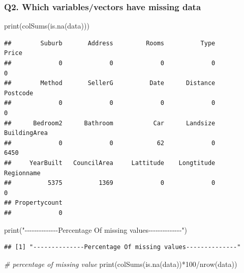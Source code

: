\documentclass[
]{article}
\newenvironment{Shaded}{\begin{snugshade}}{\end{snugshade}}
\newcommand{\CommentTok}[1]{\textcolor[rgb]{0.56,0.35,0.01}{\textit{#1}}}
\newcommand{\DecValTok}[1]{\textcolor[rgb]{0.00,0.00,0.81}{#1}}
\newcommand{\FunctionTok}[1]{\textcolor[rgb]{0.00,0.00,0.00}{#1}}
\newcommand{\NormalTok}[1]{#1}
\newcommand{\SpecialCharTok}[1]{\textcolor[rgb]{0.00,0.00,0.00}{#1}}
\newcommand{\StringTok}[1]{\textcolor[rgb]{0.31,0.60,0.02}{#1}}
\begin{document}
\hypertarget{q2.-which-variablesvectors-have-missing-data}{%
\subsubsection{Q2. Which variables/vectors have missing
data}\label{q2.-which-variablesvectors-have-missing-data}}

\begin{Shaded}
\begin{Highlighting}[]
\FunctionTok{print}\NormalTok{(}\FunctionTok{colSums}\NormalTok{(}\FunctionTok{is.na}\NormalTok{(data)))}
\end{Highlighting}
\end{Shaded}

\begin{verbatim}
##        Suburb       Address         Rooms          Type         Price 
##             0             0             0             0             0 
##        Method       SellerG          Date      Distance      Postcode 
##             0             0             0             0             0 
##      Bedroom2      Bathroom           Car      Landsize  BuildingArea 
##             0             0            62             0          6450 
##     YearBuilt   CouncilArea     Lattitude    Longtitude    Regionname 
##          5375          1369             0             0             0 
## Propertycount 
##             0
\end{verbatim}

\begin{Shaded}
\begin{Highlighting}[]
\FunctionTok{print}\NormalTok{(}\StringTok{"{-}{-}{-}{-}{-}{-}{-}{-}{-}{-}{-}{-}{-}{-}Percentage Of missing values{-}{-}{-}{-}{-}{-}{-}{-}{-}{-}{-}{-}{-}{-}"}\NormalTok{)}
\end{Highlighting}
\end{Shaded}

\begin{verbatim}
## [1] "--------------Percentage Of missing values--------------"
\end{verbatim}

\begin{Shaded}
\begin{Highlighting}[]
\CommentTok{\# percentage of missing value}
\FunctionTok{print}\NormalTok{(}\FunctionTok{colSums}\NormalTok{(}\FunctionTok{is.na}\NormalTok{(data))}\SpecialCharTok{*}\DecValTok{100}\SpecialCharTok{/}\FunctionTok{nrow}\NormalTok{(data))}
\end{Highlighting}
\end{Shaded}
\end{document}
